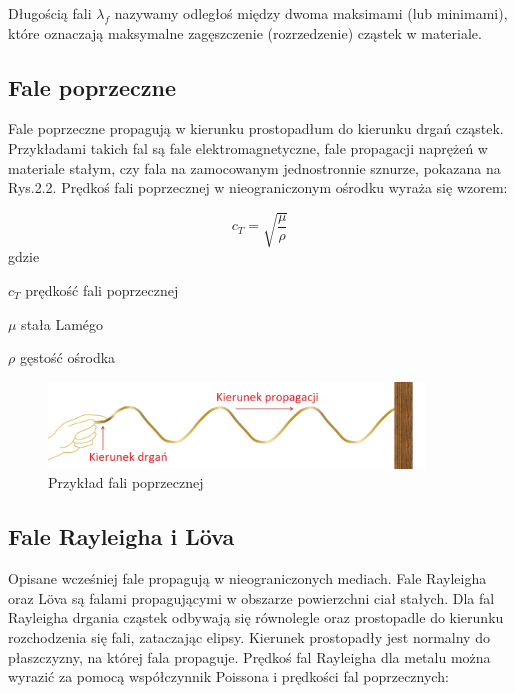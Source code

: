 Długością fali \( \lambda_f \) nazywamy odległoś między dwoma maksimami (lub minimami), które oznaczają maksymalne zagęszczenie (rozrzedzenie) cząstek w materiale.

\subsection{Fale poprzeczne}

Fale poprzeczne propagują w kierunku prostopadłum do kierunku drgań cząstek. Przykładami takich fal są fale elektromagnetyczne, fale propagacji naprężeń w materiale stałym, czy fala na zamocowanym jednostronnie sznurze, pokazana na Rys.2.2. Prędkoś fali poprzecznej w nieograniczonym ośrodku wyraża się wzorem:

\begin{equation}
c_T=\sqrt{\frac{\mu}{\rho}}
\end{equation}
gdzie
\begin{eqwhere}[2cm]
        \item[$c_T$] prędkość fali poprzecznej
        \item[$\mu$] stała Lam\'{e}go
        \item[$\rho$] gęstość ośrodka
\end{eqwhere}

\begin{figure}[h]
\centering
\includegraphics[width=10cm]{Zdjecia/2/fala_poprzeczna}
\caption{Przykład fali poprzecznej}
\label{fig:fala_poprzeczna}
\end{figure}

\subsection{Fale Rayleigha i L\"{o}va}

Opisane wcześniej fale propagują w nieograniczonych mediach. Fale Rayleigha oraz L\"{o}va są falami propagującymi w obszarze powierzchni ciał stałych. Dla fal Rayleigha drgania cząstek odbywają się równolegle oraz prostopadle do kierunku rozchodzenia się fali, zataczając elipsy. Kierunek prostopadły jest normalny do płaszczyzny, na której fala propaguje. Prędkoś fal Rayleigha dla metalu można wyrazić za pomocą współczynnik Poissona i prędkości fal poprzecznych:

